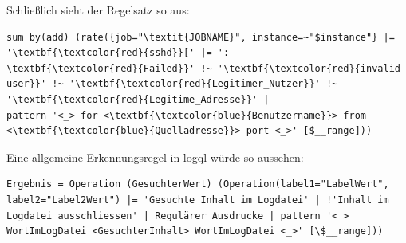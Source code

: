 Schließlich sieht der Regelsatz so aus:

{
\begin{Verbatim}[fontsize=\small, commandchars=\\\{\}, frame=single]
sum by(add) (rate({job="\textit{JOBNAME}", instance=~"$instance"} |= '\textbf{\textcolor{red}{sshd}}[' |= ': 
\textbf{\textcolor{red}{Failed}}' !~ '\textbf{\textcolor{red}{invalid user}}' !~ '\textbf{\textcolor{red}{Legitimer_Nutzer}}' !~ '\textbf{\textcolor{red}{Legitime_Adresse}}' |
pattern '<_> for <\textbf{\textcolor{blue}{Benutzername}}> from  <\textbf{\textcolor{blue}{Quelladresse}}> port <_>' [$__range]))
\end{Verbatim}
}


Eine allgemeine Erkennungsregel in \gls{logql} würde so aussehen:
{
\begin{Verbatim}[frame=single]
Ergebnis = Operation (GesuchterWert) (Operation(label1="LabelWert", 
label2="Label2Wert") |= 'Gesuchte Inhalt im Logdatei' | !'Inhalt im 
Logdatei ausschliessen' | Regulärer Ausdrucke | pattern '<_>
WortImLogDatei <GesuchterInhalt> WortImLogDatei <_>' [\$__range]))
\end{Verbatim}
}





